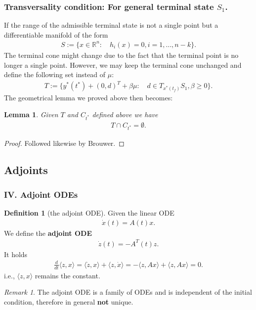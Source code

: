 \documentclass[a4paper,11pt,fleqn]{book}
\newtheorem{lemma}[theorem]{Lemma}
\theoremstyle{definition}
\newtheorem{definition}{Definition}[section]
\theoremstyle{remark}
\newtheorem*{remark}{Remark}
\begin{document}
\subsubsection{Transversality condition: For general terminal state $S_1$.}
If the range of the admissible terminal state is not a single point but a differentiable manifold of the form
\begin{align*}
	S:= \{x \in \mathbb{R}^n: \quad h_i(x) = 0, i = 1, \dots, n -k \}. 
\end{align*}
The terminal cone might change due to the fact that the terminal point is no longer a single point. However, we may keep the terminal cone unchanged and define the following set instead of $\mu$: 
\begin{align*}
	T:= \{ y^*(t^*) +  (0, d)^T + \beta \mu: \quad d \in T_{x^*(t_f)}S_1, \beta \ge 0 \}. 
\end{align*}
The geometrical lemma we proved above then becomes:
\begin{lemma}
Given $T$ and $C_{t^*}$ defined above we have
\begin{align*}
	T \cap C_{t^*} = \emptyset. 
\end{align*}
\end{lemma}
\begin{proof}
	Followed likewise by Brouwer. 
\end{proof}




\subsection{Adjoints}
\subsubsection{IV. Adjoint ODEs}
\begin{definition}[the adjoint ODE]
Given the linear ODE
\begin{align*}
	\dot{x}(t) = A(t) x. 
\end{align*}	
We define the \textbf{adjoint ODE}
\begin{align*}
	\dot{z}(t)= - A^T(t) z.
\end{align*}
It holds
\begin{align*}
	\frac{d}{dt} \langle z, x\rangle = \langle \dot{z}, x\rangle + \langle z, \dot{x} \rangle = -\langle  z, A x \rangle + \langle z, Ax \rangle = 0.
\end{align*}
i.e., $\langle z, x \rangle $ remains the constant. 
\end{definition}
\begin{remark}
The adjoint ODE is a family of ODEs and is independent of the initial condition, therefore in general \textbf{not} unique. 
\end{remark}
\end{document}
